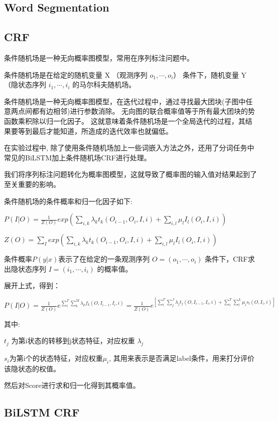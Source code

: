 \subsection{Word Segmentation}
\label{sec:cws}

\subsection*{CRF}

条件随机场是一种无向概率图模型，常用在序列标注问题中。

条件随机场是在给定的随机变量 X （观测序列 $o_{1}, \cdots, o_{i}$） 条件下，随机变量 Y （隐状态序列 $i_{1}, \cdots, i_{i}$ 的马尔科夫随机场。

条件随机场是一种无向概率图模型，在迭代过程中，通过寻找最大团块(子图中任意两点间都有边相邻)进行参数消除。
无向图的联合概率值等于所有最大团块的势函数乘积除以归一化因子。
这就意味着条件随机场是一个全局迭代的过程，其结果要等到最后才能知道，所造成的迭代效率也就偏低。

在实验过程中, 除了使用条件随机场加上一些词嵌入方法之外，还用了分词任务中常见的BiLSTM加上条件随机场CRF进行处理。

我们将序列标注问题转化为概率图模型，这就导致了概率图的输入值对结果起到了至关重要的影响。

条件随机场的条件概率和归一化因子如下:

$P(I|O) = \frac{1}{Z(O)}exp( \sum_{i,k}^{}{\lambda_{k}}t_{k}(O_{i-1},O_{i},I,i)+\sum_{i,l}^{}{\mu_{l}}I_{l}(O_{i},I,i) )$

$Z(O)= \sum_{I}^{}{exp( \sum_{i,k}^{}{\lambda_{k}}t_{k}(O_{i-1},O_{i},I,i)+\sum_{i,l}^{}{\mu_{l}}I_{l}(O_{i},I,i) )}$

条件概率$P(y|x)$表示了在给定的一条观测序列 $O=(o_{1},\cdots, o_{i})$ 条件下，CRF求出隐状态序列 $I=(i_{1},\cdots, i_{i})$ 的概率值。

展开上式，得到：

$P(I | O)=\frac{1}{Z(O)} e^{\sum_{i}^{T}\sum_{k}^{M}\lambda_{k}f_{k}(O,I_{i-1},I_{i},i)}=\frac{1}{Z(O)} e^{ [ \sum_{i}^{T}\sum_{j}^{J}\lambda_{j}t_{j}(O,I_{i-1},I_{i},i) + \sum_{i}^{T}\sum_{l}^{L}\mu_{l}s_{l}(O,I_{i},i) ] }$


其中:

$t_{j}$ 为第i状态的转移到j状态特征，对应权重 $\lambda_{j}$

$s_i$为第i个的状态特征，对应权重$μ_i$, 其用来表示是否满足label条件，用来打分评价该隐状态的权值。

然后对Score进行求和归一化得到其概率值。

\subsection*{BiLSTM CRF}

